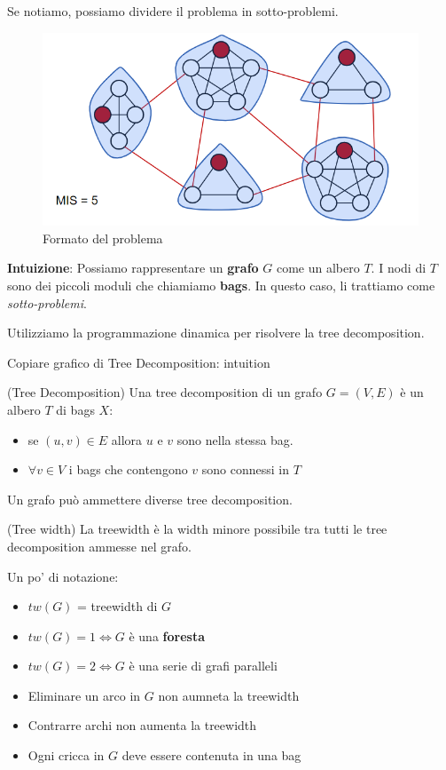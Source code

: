Se notiamo, possiamo dividere il problema in sotto-problemi.

\begin{figure}
    \begin{center}
        \includegraphics[scale=0.5]{chapters/images/clique format.png}
    \end{center}
    \caption{Formato del problema}
\end{figure}

\textbf{Intuizione}: Possiamo rappresentare un \textbf{grafo} $G$ come un albero $T$. I nodi di $T$ sono dei piccoli
moduli che chiamiamo \textbf{bags}. In questo caso, li trattiamo come \textit{sotto-problemi}.

Utilizziamo la programmazione dinamica per risolvere la tree decomposition.

Copiare grafico di Tree Decomposition: intuition

\begin{definition}(Tree Decomposition)
    Una tree decomposition di un grafo $G = (V,E)$ è un albero $T$ di bags $X$:
    \begin{itemize}
        \item se $(u,v) \in E$ allora $u$ e $v$ sono nella stessa bag.
        \item $\forall v \in V$ i bags che contengono $v$ sono connessi in $T$
    \end{itemize}

    Un grafo può ammettere diverse tree decomposition.
\end{definition}

\begin{definition}(Tree width)
    La treewidth è la width minore possibile tra tutti le tree decomposition ammesse nel grafo.

    Un po' di notazione:
    \begin{itemize}
        \item $tw(G)$ = treewidth di $G$
        \item $tw(G) = 1 \iff  G$ è una \textbf{foresta}
        \item $tw(G) = 2 \iff G$ è una serie di grafi paralleli
        \item Eliminare un arco in $G$ non aumneta la treewidth
        \item Contrarre archi non aumenta la treewidth
        \item Ogni cricca in $G$ deve essere contenuta in una bag
    \end{itemize}
\end{definition}

